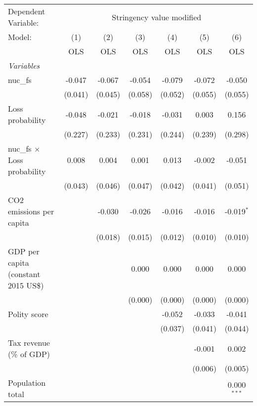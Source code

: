 
\begingroup
\centering
\begin{tabular}{lcccccc}
   \toprule
   Dependent Variable: & \multicolumn{6}{c}{Stringency value modified}\\
   Model:                               & (1)     & (2)     & (3)     & (4)     & (5)     & (6)\\  
                                        &  OLS    & OLS     & OLS     & OLS     & OLS     & OLS\\  
   \midrule
   \emph{Variables}\\
   nuc\_fs                              & -0.047  & -0.067  & -0.054  & -0.079  & -0.072  & -0.050\\   
                                        & (0.041) & (0.045) & (0.058) & (0.052) & (0.055) & (0.055)\\   
   Loss probability                     & -0.048  & -0.021  & -0.018  & -0.031  & 0.003   & 0.156\\   
                                        & (0.227) & (0.233) & (0.231) & (0.244) & (0.239) & (0.298)\\   
   nuc\_fs $\times$ Loss probability    & 0.008   & 0.004   & 0.001   & 0.013   & -0.002  & -0.051\\   
                                        & (0.043) & (0.046) & (0.047) & (0.042) & (0.041) & (0.051)\\   
   CO2 emissions per capita             &         & -0.030  & -0.026  & -0.016  & -0.016  & -0.019$^{*}$\\   
                                        &         & (0.018) & (0.015) & (0.012) & (0.010) & (0.010)\\   
   GDP per capita (constant 2015 US\$)  &         &         & 0.000   & 0.000   & 0.000   & 0.000\\   
                                        &         &         & (0.000) & (0.000) & (0.000) & (0.000)\\   
   Polity score                         &         &         &         & -0.052  & -0.033  & -0.041\\   
                                        &         &         &         & (0.037) & (0.041) & (0.044)\\   
   Tax revenue (\% of GDP)              &         &         &         &         & -0.001  & 0.002\\   
                                        &         &         &         &         & (0.006) & (0.005)\\   
   Population total                     &         &         &         &         &         & 0.000$^{***}$\\   

\end{tabular}
